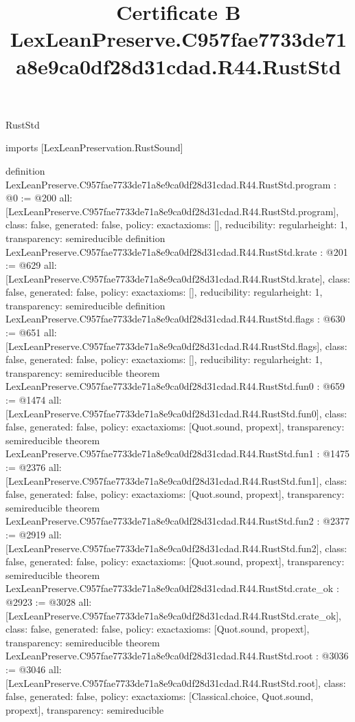 \begin{lexlean}{RustStd}
\title{Certificate B LexLeanPreserve.C957fae7733de71a8e9ca0df28d31cdad.R44.RustStd}
\begin{coremodule}
imports [LexLeanPreservation.RustSound]

definition LexLeanPreserve.C957fae7733de71a8e9ca0df28d31cdad.R44.RustStd.program : @0 := @200 {
  all: [LexLeanPreserve.C957fae7733de71a8e9ca0df28d31cdad.R44.RustStd.program],
  class: false,
  generated: false,
  policy: exact{axioms: []},
  reducibility: regular{height: 1},
  transparency: semireducible
}
definition LexLeanPreserve.C957fae7733de71a8e9ca0df28d31cdad.R44.RustStd.krate : @201 := @629 {
  all: [LexLeanPreserve.C957fae7733de71a8e9ca0df28d31cdad.R44.RustStd.krate],
  class: false,
  generated: false,
  policy: exact{axioms: []},
  reducibility: regular{height: 1},
  transparency: semireducible
}
definition LexLeanPreserve.C957fae7733de71a8e9ca0df28d31cdad.R44.RustStd.flags : @630 := @651 {
  all: [LexLeanPreserve.C957fae7733de71a8e9ca0df28d31cdad.R44.RustStd.flags],
  class: false,
  generated: false,
  policy: exact{axioms: []},
  reducibility: regular{height: 1},
  transparency: semireducible
}
theorem LexLeanPreserve.C957fae7733de71a8e9ca0df28d31cdad.R44.RustStd.fun0 : @659 := @1474 {
  all: [LexLeanPreserve.C957fae7733de71a8e9ca0df28d31cdad.R44.RustStd.fun0],
  class: false,
  generated: false,
  policy: exact{axioms: [Quot.sound, propext]},
  transparency: semireducible
}
theorem LexLeanPreserve.C957fae7733de71a8e9ca0df28d31cdad.R44.RustStd.fun1 : @1475 := @2376 {
  all: [LexLeanPreserve.C957fae7733de71a8e9ca0df28d31cdad.R44.RustStd.fun1],
  class: false,
  generated: false,
  policy: exact{axioms: [Quot.sound, propext]},
  transparency: semireducible
}
theorem LexLeanPreserve.C957fae7733de71a8e9ca0df28d31cdad.R44.RustStd.fun2 : @2377 := @2919 {
  all: [LexLeanPreserve.C957fae7733de71a8e9ca0df28d31cdad.R44.RustStd.fun2],
  class: false,
  generated: false,
  policy: exact{axioms: [Quot.sound, propext]},
  transparency: semireducible
}
theorem LexLeanPreserve.C957fae7733de71a8e9ca0df28d31cdad.R44.RustStd.crate_ok : @2923 := @3028 {
  all: [LexLeanPreserve.C957fae7733de71a8e9ca0df28d31cdad.R44.RustStd.crate_ok],
  class: false,
  generated: false,
  policy: exact{axioms: [Quot.sound, propext]},
  transparency: semireducible
}
theorem LexLeanPreserve.C957fae7733de71a8e9ca0df28d31cdad.R44.RustStd.root : @3036 := @3046 {
  all: [LexLeanPreserve.C957fae7733de71a8e9ca0df28d31cdad.R44.RustStd.root],
  class: false,
  generated: false,
  policy: exact{axioms: [Classical.choice, Quot.sound, propext]},
  transparency: semireducible
}


\end{coremodule}
\end{lexlean}
